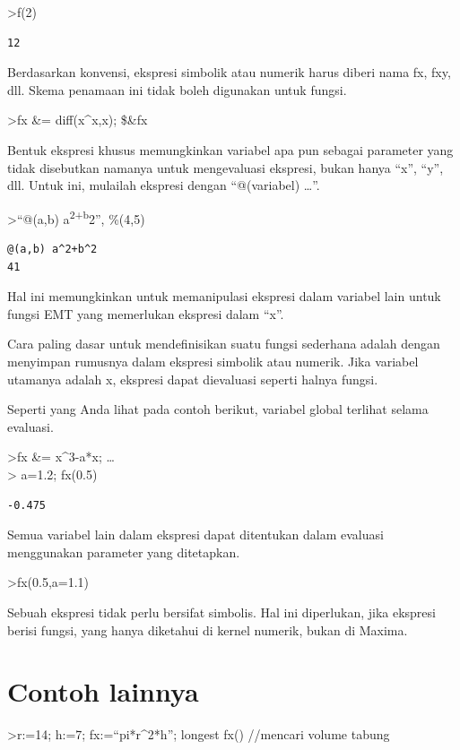 \documentclass[
]{book}
\begin{document}
\textgreater f(2)

\begin{verbatim}
12
\end{verbatim}

Berdasarkan konvensi, ekspresi simbolik atau numerik harus diberi nama fx, fxy, dll. Skema penamaan ini tidak boleh digunakan untuk fungsi.

\textgreater fx \&= diff(x\^{}x,x); \$\&fx

Bentuk ekspresi khusus memungkinkan variabel apa pun sebagai parameter yang tidak disebutkan namanya untuk mengevaluasi ekspresi, bukan hanya ``x'', ``y'', dll. Untuk ini, mulailah ekspresi dengan ``@(variabel) \ldots{}''.

\textgreater{}``@(a,b) a\textsuperscript{2+b}2'', \%(4,5)

\begin{verbatim}
@(a,b) a^2+b^2
41
\end{verbatim}

Hal ini memungkinkan untuk memanipulasi ekspresi dalam variabel lain untuk fungsi EMT yang memerlukan ekspresi dalam ``x''.

Cara paling dasar untuk mendefinisikan suatu fungsi sederhana adalah dengan menyimpan rumusnya dalam ekspresi simbolik atau numerik. Jika variabel utamanya adalah x, ekspresi dapat dievaluasi seperti halnya fungsi.

Seperti yang Anda lihat pada contoh berikut, variabel global terlihat selama evaluasi.

\textgreater fx \&= x\^{}3-a*x; \ldots{}\\
\textgreater{} a=1.2; fx(0.5)

\begin{verbatim}
-0.475
\end{verbatim}

Semua variabel lain dalam ekspresi dapat ditentukan dalam evaluasi menggunakan parameter yang ditetapkan.

\textgreater fx(0.5,a=1.1)

Sebuah ekspresi tidak perlu bersifat simbolis. Hal ini diperlukan, jika ekspresi berisi fungsi, yang hanya diketahui di kernel numerik, bukan di Maxima.

\chapter{Contoh lainnya}\label{contoh-lainnya-6}

\textgreater r:=14; h:=7; fx:=``pi*r\^{}2*h''; longest fx() //mencari volume tabung
\end{document}

